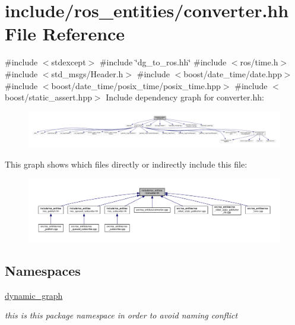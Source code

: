 \hypertarget{converter_8hh}{}\section{include/ros\+\_\+entities/converter.hh File Reference}
\label{converter_8hh}
{\ttfamily \#include $<$stdexcept$>$}\newline
{\ttfamily \#include \char`\"{}dg\+\_\+to\+\_\+ros.\+hh\char`\"{}}\newline
{\ttfamily \#include $<$ros/time.\+h$>$}\newline
{\ttfamily \#include $<$std\+\_\+msgs/\+Header.\+h$>$}\newline
{\ttfamily \#include $<$boost/date\+\_\+time/date.\+hpp$>$}\newline
{\ttfamily \#include $<$boost/date\+\_\+time/posix\+\_\+time/posix\+\_\+time.\+hpp$>$}\newline
{\ttfamily \#include $<$boost/static\+\_\+assert.\+hpp$>$}\newline
Include dependency graph for converter.\+hh\+:
\nopagebreak
\begin{figure}[H]
\begin{center}
\leavevmode
\includegraphics[width=350pt]{converter_8hh__incl}
\end{center}
\end{figure}
This graph shows which files directly or indirectly include this file\+:
\nopagebreak
\begin{figure}[H]
\begin{center}
\leavevmode
\includegraphics[width=350pt]{converter_8hh__dep__incl}
\end{center}
\end{figure}
\subsection*{Namespaces}
\begin{DoxyCompactItemize}
\item 
 \hyperlink{namespacedynamic__graph}{dynamic\+\_\+graph}
\begin{DoxyCompactList}\small\item\em this is this package namespace in order to avoid naming conflict \end{DoxyCompactList}\end{DoxyCompactItemize}
